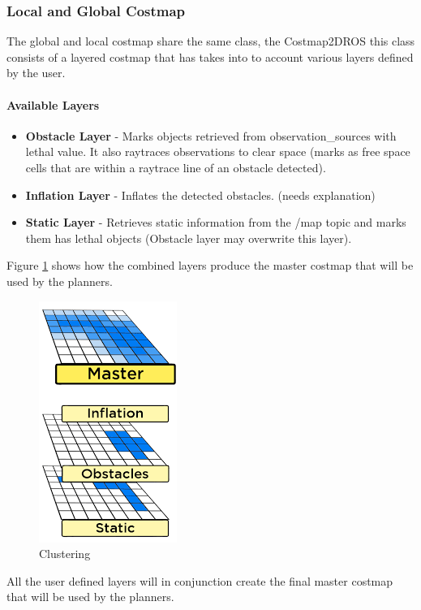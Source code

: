 \documentclass[12pt]{article}
\begin{document}
\subsubsection{Local and Global Costmap}
The global and local costmap share the same class, the  Costmap2DROS this class consists of a layered costmap that has takes into to account various layers defined by the user.

\paragraph{Available Layers}
\begin{itemize}[label={}]
    \item \textbf{Obstacle Layer} - Marks objects retrieved from observation\_sources with lethal value. It also raytraces observations to clear space (marks as free space cells that are within a raytrace line of an obstacle detected).
    \item \textbf{Inflation Layer} - Inflates the detected obstacles. (needs explanation)
    \item \textbf{Static Layer} - Retrieves static information from the /map topic and marks them has lethal objects (Obstacle layer may overwrite this layer).
\end{itemize}
Figure \ref{fig:layers} shows how the combined layers produce the master costmap that will be used by the planners.
\begin{figure}[!htb]
    \centering
    \includegraphics{layers.png}
    \caption{Clustering}
    \label{fig:layers}
\end{figure}
All the user defined layers will in conjunction create the final master costmap that will be used by the planners.
\end{document}
